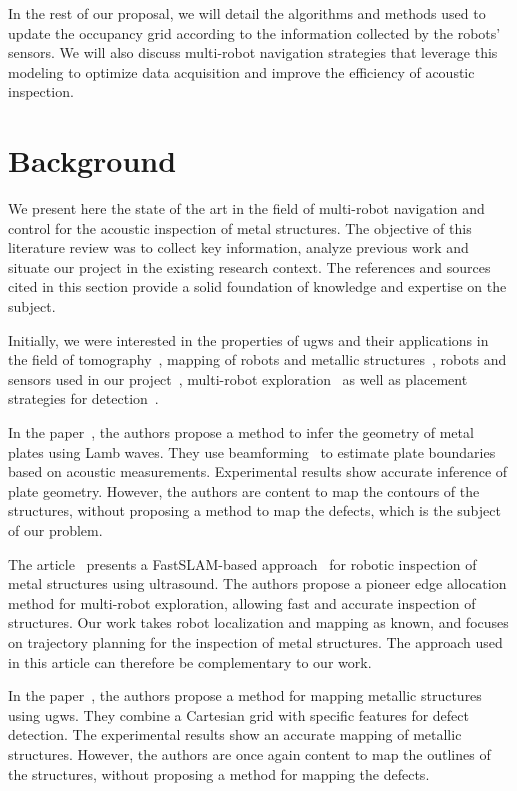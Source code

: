 In the rest of our proposal, we will detail the algorithms and methods used to update the occupancy grid according to the information collected by the robots' sensors.
We will also discuss multi-robot navigation strategies that leverage this modeling to optimize data acquisition and improve the efficiency of acoustic inspection.

\section{Background}

We present here the state of the art in the field of multi-robot navigation and control for the acoustic inspection of metal structures.
The objective of this literature review was to collect key information, analyze previous work and situate our project in the existing research context.
The references and sources cited in this section provide a solid foundation of knowledge and expertise on the subject.

Initially, we were interested in the properties of \gls{ugw}s and their applications in the field of tomography~\cite{OUABI2022106705, HUTHWAITE2013979}, mapping of robots and metallic structures~\cite{9364359, 9811581, inventions3030059, 9568841}, robots and sensors used in our project~\cite{s22093235}, multi-robot exploration~\cite{bautin:hal-00757960, articlesvsdf} as well as placement strategies for detection~\cite{article455556, 7487624, 7139673}.

In the paper~\cite{OUABI2022106705}, the authors propose a method to infer the geometry of metal plates using Lamb waves.
They use beamforming~\cite{enwiki:1151960654} to estimate plate boundaries based on acoustic measurements.
Experimental results show accurate inference of plate geometry.
However, the authors are content to map the contours of the structures, without proposing a method to map the defects, which is the subject of our problem.

The article~\cite{9364359} presents a FastSLAM-based approach~\cite{article254524} for robotic inspection of metal structures using ultrasound.
The authors propose a pioneer edge allocation method for multi-robot exploration, allowing fast and accurate inspection of structures.
Our work takes robot localization and mapping as known, and focuses on trajectory planning for the inspection of metal structures.
The approach used in this article can therefore be complementary to our work.

In the paper~\cite{9811581}, the authors propose a method for mapping metallic structures using \gls{ugw}s.
They combine a Cartesian grid with specific features for defect detection.
The experimental results show an accurate mapping of metallic structures.
However, the authors are once again content to map the outlines of the structures, without proposing a method for mapping the defects.

